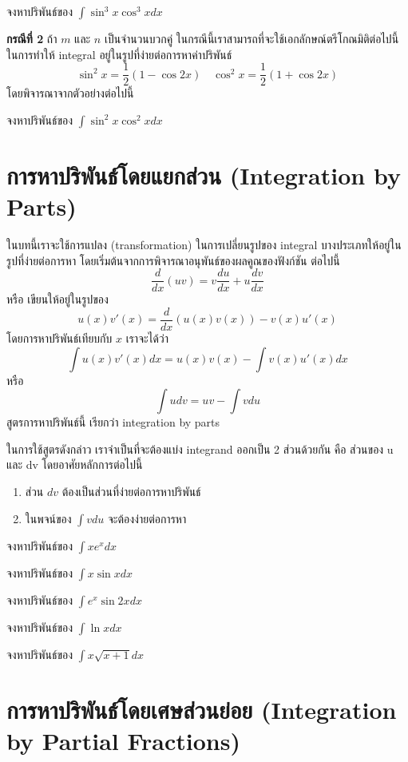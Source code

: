 \documentclass[
]{book}
\begin{document}
จงหาปริพันธ์ของ \(\int \sin^3 x \cos^3 x dx\)

\textbf{กรณีที่ 2} ถ้า \(m\) และ \(n\) เป็นจำนวนบวกคู่
ในกรณีนี้เราสามารถที่จะใช้เอกลักษณ์ตรีโกณมิติต่อไปนี้ในการทำให้ integral
อยู่ในรูปที่ง่ายต่อการหาค่าปริพันธ์
\[\sin^2 x = \frac{1}{2}(1-\cos 2x) \quad  \cos^2 x = \frac{1}{2}(1 + \cos 2x)\]
โดยพิจารณาจากตัวอย่างต่อไปนี้

จงหาปริพันธ์ของ \(\int \sin^2 x \cos^2 x dx\)

\section{การหาปริพันธ์โดยแยกส่วน (Integration by
Parts)}\label{uxe01uxe32uxe23uxe2buxe32uxe1buxe23uxe1euxe19uxe18uxe42uxe14uxe22uxe41uxe22uxe01uxe2auxe27uxe19-integration-by-parts}

ในบทนี้เราจะใช้การแปลง (transformation) ในการเปลี่ยนรูปของ integral
บางประเภทให้อยู่ในรูปที่ง่ายต่อการหา โดยเริ่มต้นจากการพิจารณาอนุพันธ์ของผลคูณของฟังก์ชัน
ต่อไปนี้ \[\frac{d}{dx} (uv) = v\frac{du}{dx} + u\frac{dv}{dx}\] หรือ
เขียนให้อยู่ในรูปของ \[u(x) v'(x) = \frac{d}{dx}(u(x)v(x)) - v(x)u'(x)\]
โดยการหาปริพันธ์เทียบกับ \(x\) เราจะได้ว่า
\[\int u(x) v'(x) dx = u(x)v(x) -  \int v(x)u'(x)dx\] หรือ
\[\int u dv = uv -  \int v du\] สูตรการหาปริพันธ์นี้ เรียกว่า integration by
parts

ในการใช้สูตรดังกล่าว เราจำเป็นที่จะต้องแบ่ง integrand ออกเป็น 2 ส่วนด้วยกัน คือ ส่วนของ
u และ dv โดยอาศัยหลักการต่อไปนี้

\begin{enumerate}
\def\labelenumi{\arabic{enumi}.}
\item
  ส่วน \(dv\) ต้องเป็นส่วนที่ง่ายต่อการหาปริพันธ์
\item
  ในพจน์ของ \(\int v du\) จะต้องง่ายต่อการหา
\end{enumerate}

จงหาปริพันธ์ของ \(\int x e^x dx\)

จงหาปริพันธ์ของ \(\int x \sin x dx\)

จงหาปริพันธ์ของ \(\int e^x \sin 2x dx\)

จงหาปริพันธ์ของ \(\int \ln xdx\)

จงหาปริพันธ์ของ \(\int x \sqrt{x+1}dx\)

\section{การหาปริพันธ์โดยเศษส่วนย่อย (Integration by Partial
Fractions)}\label{uxe01uxe32uxe23uxe2buxe32uxe1buxe23uxe1euxe19uxe18uxe42uxe14uxe22uxe40uxe28uxe29uxe2auxe27uxe19uxe22uxe2duxe22-integration-by-partial-fractions}
\end{document}
